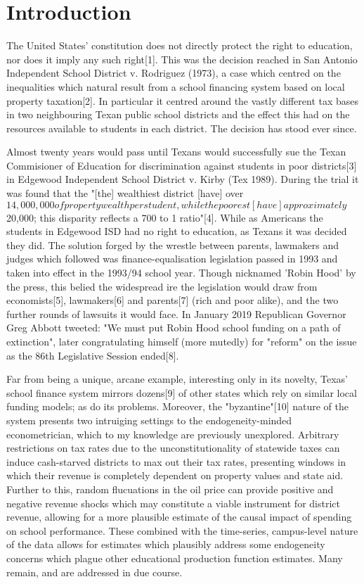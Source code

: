 \documentclass[11pt]{article}
\begin{document}
\setlength{\baselineskip}{0.3in} 


\section{Introduction}
\label{s:intro}

The United States' constitution does not directly protect the right to education, nor does it imply any such right[1]. This was the decision reached in San Antonio Independent School District v. Rodriguez (1973), a case which centred on the inequalities which natural result from a school financing system based on local property taxation[2]. In particular it centred around the vastly different tax bases in two neighbouring Texan public school districts and the effect this had on the resources available to students in each district. The decision has stood ever since. 

Almost twenty years would pass until Texans would successfully sue the Texan Commisioner of Education for discrimination against students in poor districts[3] in Edgewood Independent School District v. Kirby (Tex 1989). During the trial it was found that the "[the] wealthiest district [have] over $ 14,000,000 of property wealth per student, while the poorest [have] approximately $ 20,000; this disparity reflects a 700 to 1 ratio"[4]. While as Americans the students in Edgewood ISD had no right to education, as Texans it was decided they did. The solution forged by the wrestle between parents, lawmakers and judges which followed was finance-equalisation legislation passed in 1993 and taken into effect in the 1993/94 school year. Though nicknamed 'Robin Hood' by the press, this belied the widespread ire the legislation would draw from economists[5], lawmakers[6] and parents[7] (rich and poor alike), and the two further rounds of lawsuits it would face. In January 2019 Republican Governor Greg Abbott tweeted: "We must put Robin Hood school funding on a path of extinction", later congratulating himself (more mutedly) for "reform" on the issue as the 86th Legislative Session ended[8].

Far from being a unique, arcane example, interesting only in its novelty, Texas' school finance system mirrors dozens[9] of other states which rely on similar local funding models; as do its problems. Moreover, the "byzantine"[10] nature of the system presents two intruiging settings to the endogeneity-minded econometrician, which to my knowledge are previously unexplored. Arbitrary restrictions on tax rates due to the unconstitutionality of statewide taxes can induce cash-starved districts to max out their tax rates, presenting windows in which their revenue is completely dependent on property values and state aid. Further to this, random flucuations in the oil price can provide positive and negative revenue shocks which may constitute a viable instrument for district revenue, allowing for a more plausible estimate of the causal impact of spending on school performance. These combined with the time-series, campus-level nature of the data allows for estimates which plausibly address some endogeneity concerns which plague other educational production function estimates. Many remain, and are addressed in due course. 
\end{document}
